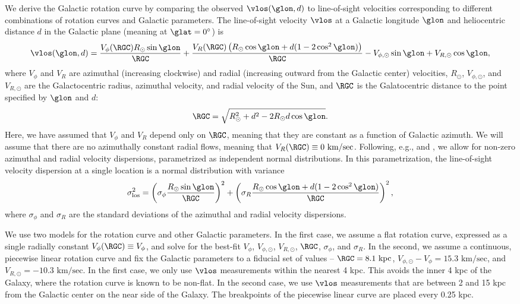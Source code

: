 We derive the Galactic rotation curve by comparing the observed $\vlos(\glon, d)$ to line-of-sight velocities corresponding to different combinations of rotation curves and Galactic parameters. 
The line-of-sight velocity $\vlos$ at a Galactic longitude $\glon$ and heliocentric distance $d$ in the Galactic plane (meaning at $\glat=0^\circ$) is 
\begin{equation}
\label{eqn:vlos_mean}
\vlos(\glon, d) = \frac{V_\phi (\RGC) R_\odot \sin\glon}{\RGC} + 
\frac{V_R (\RGC) \left(R_\odot \cos \glon + d (1 - 2 \cos^2 \glon)  \right) }{\RGC} - V_{\phi, \odot} \sin \glon + V_{R, \odot} \cos \glon,
\end{equation}
where $V_\phi$ and $V_R$ are azimuthal (increasing clockwise) and radial (increasing outward from the Galactic center) velocities, $R_\odot$, $V_{\phi, \odot}$, and $V_{R, \odot}$ are the Galactocentric radius, azimuthal velocity, and radial velocity of the Sun, and $\RGC$ is the Galatocentric distance to the point specified by $\glon$ and $d$:
\begin{equation}
\RGC = \sqrt{R^2_\odot + d^2 - 2 R_\odot d \cos \glon}.
\end{equation}
Here, we have assumed that $V_\phi$ and $V_R$ depend only on $\RGC$, meaning that they are constant as a function of Galactic azimuth.
We will assume that there are no azimuthally constant radial flows, meaning that $V_R(\RGC) \equiv 0\text{ km/sec}$.
Following, e.g., \citet{Reid:2009jb} and \citet{Bovy_2009}, we allow for non-zero azimuthal and radial velocity dispersions, parametrized as independent normal distributions. 
In this parametrization, the line-of-sight velocity dispersion at a single location is a normal distribution with variance
\begin{equation}
\label{eqn:vlos_var}
\sigma^2_\mathrm{los} = \left(\sigma_\phi \frac{R_\odot \sin \glon}{\RGC} \right)^2 + 
\left(\sigma_R  \frac{R_\odot \cos \glon + d (1 - 2 \cos^2 \glon)}{\RGC} \right)^2,
\end{equation}
where $\sigma_\phi$ and $\sigma_R$ are the standard deviations of the azimuthal and radial velocity dispersions. 

We use two models for the rotation curve and other Galactic parameters. 
In the first case, we assume a flat rotation curve, expressed as a single radially constant $V_\phi(\RGC) \equiv V_\phi$, and solve for the best-fit $V_\phi$, $V_{\phi, \odot}$, $V_{R, \odot}$, $\RGC$, $\sigma_\phi$, and $\sigma_R$. 
In the second, we assume a continuous, piecewise linear rotation curve and fix the Galactic parameters to a fiducial set of values -- $\RGC = 8.1\text{ kpc}$, $V_{\phi, \odot} - V_{\phi} = 15.3 \text{ km/sec}$, and $V_{R, \odot} = - 10.3 \text{ km/sec}$. 
In the first case, we only use $\vlos$ measurements within the nearest 4 kpc.
This avoids the inner 4 kpc of the Galaxy, where the rotation curve is known to be non-flat.
In the second case, we use $\vlos$ measurements that are between 2 and 15 kpc from the Galactic center on the near side of the Galaxy. 
The breakpoints of the piecewise linear curve are placed every 0.25 kpc.

